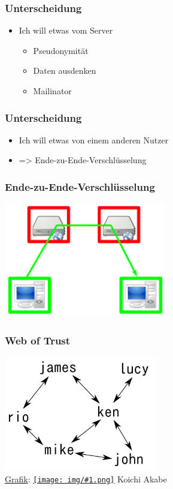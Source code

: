 \documentclass[12pt]{beamer}
\newcommand{\cc}[1]{\texttt{[image: img/\#1.png]}\hspace{1mm}}
\begin{document}
\begin{frame}
    \frametitle{Unterscheidung}
    \begin{itemize}
      \item<2-> Ich will etwas vom Server
        \begin{itemize}
          \item<3-> Pseudonymität
          \item<4-> Daten ausdenken
          \item<5-> Mailinator
        \end{itemize}
    \end{itemize}
\end{frame}

\begin{frame}
    \frametitle{Unterscheidung}
    \begin{itemize}
      \item<2-> Ich will etwas von einem anderen Nutzer
      \item<3-> => Ende-zu-Ende-Verschlüsselung
    \end{itemize}
\end{frame}

\begin{frame}
    \frametitle{Ende-zu-Ende-Verschlüsselung}
    \begin{center}
      \includegraphics[height=5cm]{img/fed-end-to-end.png}
    \end{center}
\end{frame}

\begin{frame}
    \frametitle{Web of Trust}
    \begin{center}
      \includegraphics[height=5cm]{img/weboftrust.png}
      \\{\small \href{http://upload.wikimedia.org/wikipedia/commons/a/ab/Web_of_trust.svg}{Grafik}: \href{http://creativecommons.org/licenses/by-sa/3.0/deed.en}{\cc{by-sa}} Koichi Akabe}
    \end{center}
\end{frame}
\end{document}
